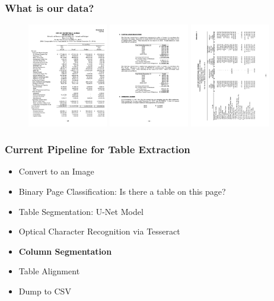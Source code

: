 \documentclass[usenames,dvipsnames]{beamer}
\begin{document}
\begin{frame}
  \frametitle{What is our data?}
  \begin{figure}
    \includegraphics[width=3.5cm, valign=c]{assets/table_big}
    \includegraphics[width=3.5cm, valign=c]{assets/table_small}
    \includegraphics[width=3.5cm, valign=c]{assets/table_rotated}
  \end{figure}
\end{frame}

\begin{frame}
  \frametitle{Current Pipeline for Table Extraction}
  \begin{itemize}
    \item Convert to an Image
    \item Binary Page Classification: Is there a table on this page?
    \item Table Segmentation: U-Net Model
    \item Optical Character Recognition via Tesseract
    \item \textbf{Column Segmentation}
    \item Table Alignment
    \item Dump to CSV
  \end{itemize}
\end{frame}
\end{document}
